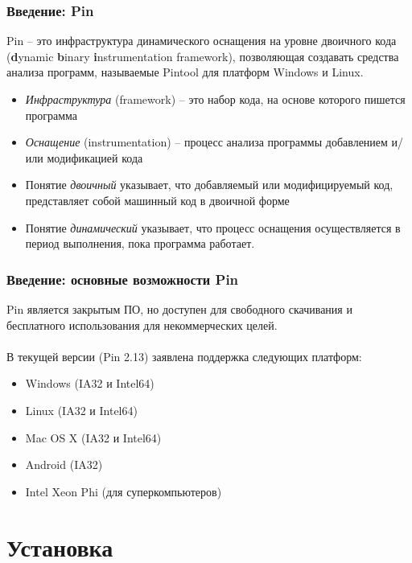 \documentclass{beamer}
\begin{document}

\begin{frame}
\frametitle{Введение: Pin}
Pin -- это инфраструктура динамического оснащения на уровне двоичного кода (\textbf{d}ynamic \textbf{b}inary \textbf{i}nstrumentation framework), позволяющая создавать средства анализа программ, называемые Pintool для платформ Windows и Linux.
\begin{itemize}
\item \textit{Инфраструктура} (framework) -- это набор кода, на основе которого пишется программа
\item \textit{Оснащение} (instrumentation) -- процесс анализа программы добавлением и/или модификацией кода
\item Понятие \textit{двоичный} указывает, что добавляемый или модифицируемый код, представляет собой машинный код в двоичной форме
\item Понятие \textit{динамический} указывает, что процесс оснащения осуществляется в период выполнения, пока программа работает.
\end{itemize}
\end{frame}


\begin{frame}
\frametitle{Введение: основные возможности Pin}
Pin является закрытым ПО, но доступен для свободного скачивания и бесплатного использования для некоммерческих целей.\\~\\

В текущей версии (Pin 2.13) заявлена поддержка следующих платформ:
\begin{itemize}
\item Windows (IA32 и Intel64)
\item Linux (IA32 и Intel64)
\item Mac OS X (IA32 и Intel64)
\item Android (IA32)
\item Intel Xeon Phi (для суперкомпьютеров)
\end{itemize}
\end{frame}

\section{Установка}
\end{document}

